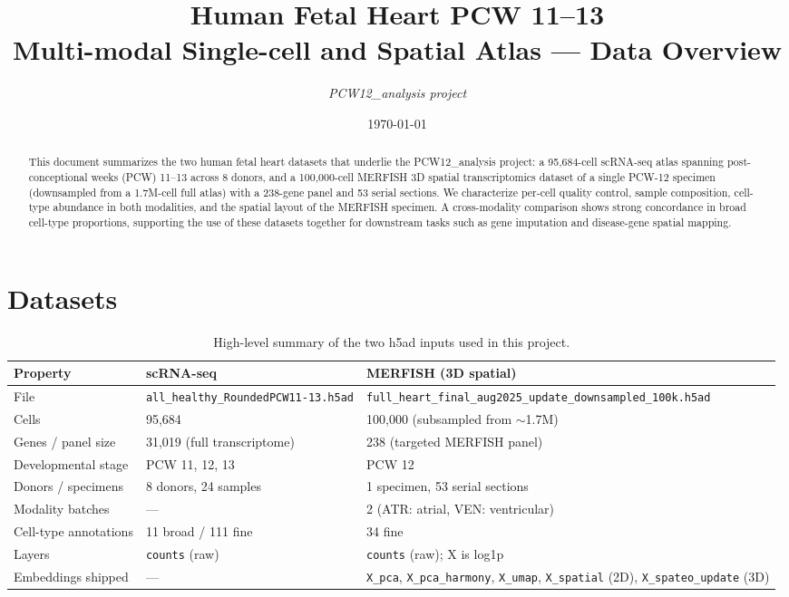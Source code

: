 \documentclass[11pt,a4paper]{article}
\title{\textbf{Human Fetal Heart PCW 11--13 \\[0.1em] \large Multi-modal Single-cell and Spatial Atlas — Data Overview}}
\author{\textit{PCW12\_analysis project}}
\date{\today}
\begin{document}
\maketitle
\thispagestyle{fancy}

\begin{abstract}
\noindent
This document summarizes the two human fetal heart datasets that underlie the
\textsf{PCW12\_analysis} project: a 95{,}684-cell scRNA-seq atlas spanning
post-conceptional weeks (PCW) 11--13 across 8 donors, and a 100{,}000-cell
MERFISH 3D spatial transcriptomics dataset of a single PCW-12 specimen
(downsampled from a 1.7M-cell full atlas) with a 238-gene panel and 53 serial
sections. We characterize per-cell quality control, sample composition,
cell-type abundance in both modalities, and the spatial layout of the MERFISH
specimen. A cross-modality comparison shows strong concordance in broad
cell-type proportions, supporting the use of these datasets together for
downstream tasks such as gene imputation and disease-gene spatial mapping.
\end{abstract}

\vspace{0.5em}

\section{Datasets}

\begin{table}[H]
\centering
\small
\renewcommand{\arraystretch}{1.15}
\begin{tabular}{@{}p{} p{} p{}@{}}
\toprule
\textbf{Property} & \textbf{scRNA-seq} & \textbf{MERFISH (3D spatial)} \\
\midrule
File & \texttt{all\_healthy\_RoundedPCW11-13.h5ad} & \texttt{full\_heart\_final\_aug2025\_update\_downsampled\_100k.h5ad} \\
Cells & 95{,}684 & 100{,}000 (subsampled from $\sim$1.7M) \\
Genes / panel size & 31{,}019 (full transcriptome) & 238 (targeted MERFISH panel) \\
Developmental stage & PCW 11, 12, 13 & PCW 12 \\
Donors / specimens & 8 donors, 24 samples & 1 specimen, 53 serial sections \\
Modality batches & --- & 2 (ATR: atrial, VEN: ventricular) \\
Cell-type annotations & 11 broad / 111 fine & 34 fine \\
Layers & \texttt{counts} (raw) & \texttt{counts} (raw); X is log1p \\
Embeddings shipped & --- & \texttt{X\_pca}, \texttt{X\_pca\_harmony}, \texttt{X\_umap}, \texttt{X\_spatial} (2D), \texttt{X\_spateo\_update} (3D) \\
\bottomrule
\end{tabular}
\caption{High-level summary of the two h5ad inputs used in this project.}
\label{tab:datasets}
\end{table}
\end{document}

